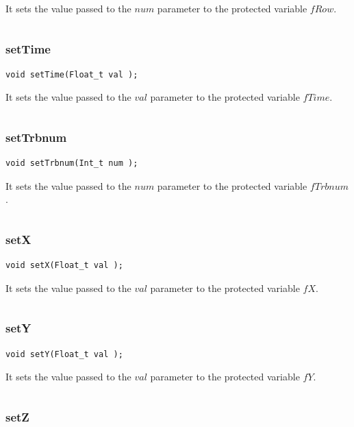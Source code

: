\documentclass[a4paper]{book}
\begin{document}
It sets the value passed to the $num$ parameter to the protected variable $fRow$.

\[\]

\subsubsection{setTime}

\begin{lstlisting}[style=customc]
void setTime(Float_t val );
\end{lstlisting}

It sets the value passed to the $val$ parameter to the protected variable $fTime$.

\[\]

\subsubsection{setTrbnum}

\begin{lstlisting}[style=customc]
void setTrbnum(Int_t num );
\end{lstlisting}

It sets the value passed to the $num$ parameter to the protected variable $fTrbnum$.

\[\]

\subsubsection{setX}

\begin{lstlisting}[style=customc]
void setX(Float_t val );
\end{lstlisting}

It sets the value passed to the $val$ parameter to the protected variable $fX$.

\[\]

\subsubsection{setY}

\begin{lstlisting}[style=customc]
void setY(Float_t val );
\end{lstlisting}

It sets the value passed to the $val$ parameter to the protected variable $fY$.

\[\]

\subsubsection{setZ}
\end{document}
